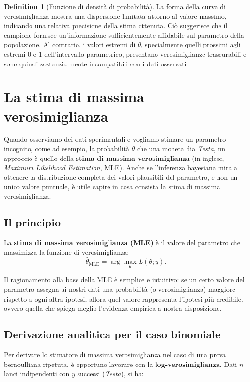 \documentclass[
  letterpaper,
  DIV=11,
  numbers=noendperiod,
  oneside]{scrreprt}
\theoremstyle{definition}
\theoremstyle{plain}
\theoremstyle{definition}
\newtheorem{definition}{Definition}[chapter]
\theoremstyle{remark}
\begin{document}
\begin{definition}[Funzione di densità di
probabilità]
La forma della curva di verosimiglianza mostra una dispersione limitata
attorno al valore massimo, indicando una relativa precisione della stima
ottenuta. Ciò suggerisce che il campione fornisce un'informazione
sufficientemente affidabile sul parametro della popolazione. Al
contrario, i valori estremi di \(\theta\), specialmente quelli prossimi
agli estremi 0 e 1 dell'intervallo parametrico, presentano
verosimiglianze trascurabili e sono quindi sostanzialmente incompatibili
con i dati osservati.

\section{La stima di massima
verosimiglianza}\label{la-stima-di-massima-verosimiglianza}

Quando osserviamo dei dati sperimentali e vogliamo stimare un parametro
incognito, come ad esempio, la probabilità \(\theta\) che una moneta dia
\emph{Testa}, un approccio è quello della \textbf{stima di massima
verosimiglianza} (in inglese, \emph{Maximum Likelihood Estimation},
MLE). Anche se l'inferenza bayesiana mira a ottenere la distribuzione
completa dei valori plausibili del parametro, e non un unico valore
puntuale, è utile capire in cosa consista la stima di massima
verosimiglianza.

\subsection{Il principio}\label{il-principio}

La \textbf{stima di massima verosimiglianza (MLE)} è il valore del
parametro che massimizza la funzione di verosimiglianza: \[
\hat{\theta}_{\text{MLE}} = \arg\max_{\theta} L(\theta; y).
\]

Il ragionamento alla base della MLE è semplice e intuitivo: se un certo
valore del parametro assegna ai nostri dati una probabilità (o
verosimiglianza) maggiore rispetto a ogni altra ipotesi, allora quel
valore rappresenta l'ipotesi più credibile, ovvero quella che spiega
meglio l'evidenza empirica a nostra disposizione.

\subsection{Derivazione analitica per il caso
binomiale}\label{derivazione-analitica-per-il-caso-binomiale}

Per derivare lo stimatore di massima verosimiglianza nel caso di una
prova bernoulliana ripetuta, è opportuno lavorare con la
\textbf{log-verosimiglianza}. Dati \(n\) lanci indipendenti con \(y\)
successi (\emph{Testa}), si ha:


\end{definition}
\end{document}
